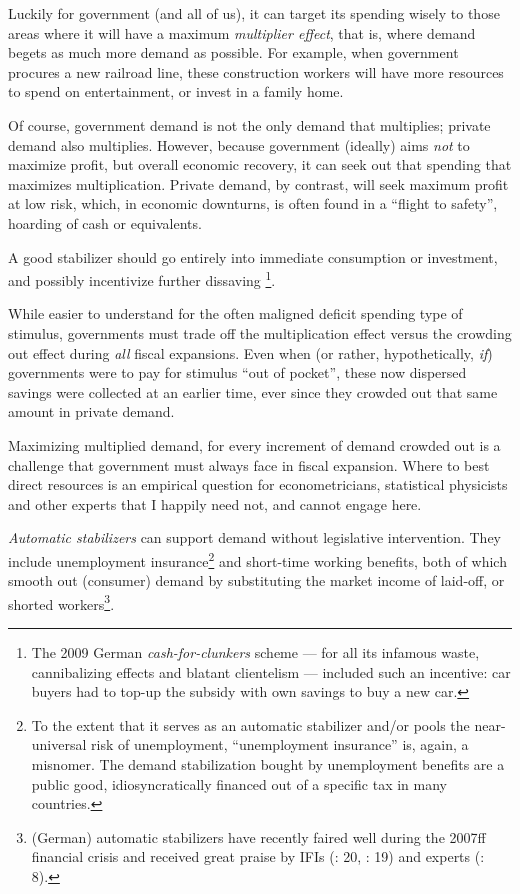 Luckily for government (and all of us), it can target its spending wisely to those areas where it will have a maximum \emph{multiplier effect}, that is, where demand begets as much more demand as possible. For example, when government procures a new railroad line, these construction workers will have more resources to spend on entertainment, or invest in a family home. 

Of course, government demand is not the only demand that multiplies; private demand also multiplies. However, because government (ideally) aims \emph{not} to maximize profit, but overall economic recovery, it can seek out that spending that maximizes multiplication. Private demand, by contrast, will seek maximum profit at low risk, which, in economic downturns, is often found in a ``flight to safety'', hoarding of cash or equivalents.

A good stabilizer should go entirely into immediate consumption or investment, and possibly incentivize further dissaving
\footnote{
	The 2009 German \emph{cash-for-clunkers} scheme --- for all its infamous waste, cannibalizing effects and blatant clientelism --- included such an incentive: car buyers had to top-up the subsidy with own savings to buy a new car.
}.

While easier to understand for the often maligned deficit spending type of stimulus, governments must trade off the multiplication effect versus the crowding out effect during \emph{all} fiscal expansions. Even when (or rather, hypothetically, \emph{if}) governments were to pay for stimulus ``out of pocket'', these now dispersed savings were collected at an earlier time, ever since they crowded out that same amount in private demand.

Maximizing multiplied demand, for every increment of demand crowded out is a challenge that government must always face in fiscal expansion. Where to best direct resources is an empirical question for econometricians, statistical physicists and other experts that I happily need not, and cannot engage here. 

	
\emph{Automatic stabilizers} can support demand without legislative intervention. They include unemployment insurance\footnote{
	To the extent that it serves as an automatic stabilizer and/or pools the near-universal risk of unemployment, ``unemployment insurance'' is, again, a misnomer. The demand stabilization bought by unemployment benefits are a public good, idiosyncratically financed out of a specific tax in many countries.} %
and short-time working benefits, both of which smooth out (consumer) demand by substituting the market income of laid-off, or shorted workers\footnote{
	(German) automatic stabilizers have recently faired well during the 2007ff financial crisis and received great praise by \glspl{IFI} (\citealt{IMF-2008-ab}: 20, \citealt{WorldBank2008}: 19) and experts (\citealt{BofingerFranz-2007-aa}: 8).}. 

